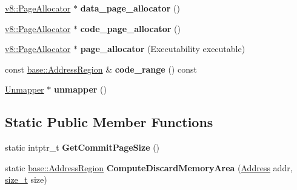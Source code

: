 \begin{DoxyCompactItemize}
\item 
\mbox{\label{classv8_1_1internal_1_1MemoryAllocator_a686cbc2a493b2544ac9e4c436fcc136b}} 
\mbox{\hyperlink{classv8_1_1PageAllocator}{v8\+::\+Page\+Allocator}} $\ast$ {\bfseries data\+\_\+page\+\_\+allocator} ()
\item 
\mbox{\label{classv8_1_1internal_1_1MemoryAllocator_a05981eb9d0bfb14aafbc56d4f73c462e}} 
\mbox{\hyperlink{classv8_1_1PageAllocator}{v8\+::\+Page\+Allocator}} $\ast$ {\bfseries code\+\_\+page\+\_\+allocator} ()
\item 
\mbox{\label{classv8_1_1internal_1_1MemoryAllocator_afceaa8c904f829d22d5206de9e25f37d}} 
\mbox{\hyperlink{classv8_1_1PageAllocator}{v8\+::\+Page\+Allocator}} $\ast$ {\bfseries page\+\_\+allocator} (Executability executable)
\item 
\mbox{\label{classv8_1_1internal_1_1MemoryAllocator_a2dce5a68af73e500d3977eb610e80dba}} 
const \mbox{\hyperlink{classv8_1_1base_1_1AddressRegion}{base\+::\+Address\+Region}} \& {\bfseries code\+\_\+range} () const
\item 
\mbox{\label{classv8_1_1internal_1_1MemoryAllocator_a47e626016282b63c20f45fbf981d496d}} 
\mbox{\hyperlink{classv8_1_1internal_1_1MemoryAllocator_1_1Unmapper}{Unmapper}} $\ast$ {\bfseries unmapper} ()
\end{DoxyCompactItemize}
\subsection*{Static Public Member Functions}
\begin{DoxyCompactItemize}
\item 
\mbox{\label{classv8_1_1internal_1_1MemoryAllocator_a26dad607a382b9c3ca6670649ed1b0f5}} 
static intptr\+\_\+t {\bfseries Get\+Commit\+Page\+Size} ()
\item 
\mbox{\label{classv8_1_1internal_1_1MemoryAllocator_ab9fe8e7b9c2f6145900440078d603383}} 
static \mbox{\hyperlink{classv8_1_1base_1_1AddressRegion}{base\+::\+Address\+Region}} {\bfseries Compute\+Discard\+Memory\+Area} (\mbox{\hyperlink{classuintptr__t}{Address}} addr, \mbox{\hyperlink{classsize__t}{size\+\_\+t}} size)
\end{DoxyCompactItemize}
